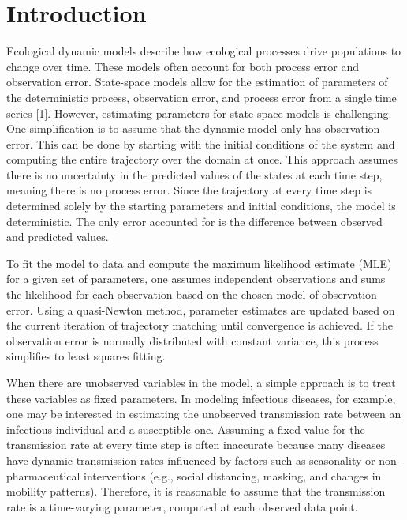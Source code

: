\documentclass[
11pt, %
oneside, %
english, %
singlespacing, %
]{macthesis} %
\begin{document}
\mainmatter %
\pagestyle{thesis}
\chapter{Introduction}\label{introduction}

Ecological dynamic models describe how ecological processes drive populations to change over time. These models often account for both process error and observation error. State-space models allow for the estimation of parameters of the deterministic process, observation error, and process error from a single time series {[}1{]}. However, estimating parameters for state-space models is challenging. One simplification is to assume that the dynamic model only has observation error. This can be done by starting with the initial conditions of the system and computing the entire trajectory over the domain at once. This approach assumes there is no uncertainty in the predicted values of the states at each time step, meaning there is no process error. Since the trajectory at every time step is determined solely by the starting parameters and initial conditions, the model is deterministic. The only error accounted for is the difference between observed and predicted values.

To fit the model to data and compute the maximum likelihood estimate (MLE) for a given set of parameters, one assumes independent observations and sums the likelihood for each observation based on the chosen model of observation error. Using a quasi-Newton method, parameter estimates are updated based on the current iteration of trajectory matching until convergence is achieved. If the observation error is normally distributed with constant variance, this process simplifies to least squares fitting.

When there are unobserved variables in the model, a simple approach is to treat these variables as fixed parameters. In modeling infectious diseases, for example, one may be interested in estimating the unobserved transmission rate between an infectious individual and a susceptible one. Assuming a fixed value for the transmission rate at every time step is often inaccurate because many diseases have dynamic transmission rates influenced by factors such as seasonality or non-pharmaceutical interventions (e.g., social distancing, masking, and changes in mobility patterns). Therefore, it is reasonable to assume that the transmission rate is a time-varying parameter, computed at each observed data point.
\end{document}
